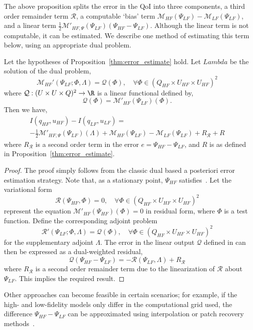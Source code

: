 The above proposition splits the error in the QoI into three components, a third order remainder term $\mathcal{R}$, a computable `bias' term $\mathcal{M}_{HF}(\Psi_{LF})-\mathcal{M}_{LF}(\Psi_{LF})$, and a linear term $\frac{1}{2}\mathcal{M}'_{HF,\Psi}(\Psi_{LF})(\Psi_{HF}-\Psi_{LF})$. Although the linear term is not computable, it can be estimated. We describe one method of estimating this term below, using an appropriate dual problem.

%
\begin{proposition}
\label{thm:error_estimate_dual}
Let the hypotheses of Proposition~\ref{thm:error_estimate} hold. Let $Lambda$ be the solution of the dual problem,
%
\begin{equation}
\mathcal{M}_{HF}'(\Psi_{LF};\Phi, \Lambda)=\mathcal{Q}(\Phi),\quad\forall\Phi\in(Q_{HF}\times U_{HF}\times U_{HF})^2
\end{equation}
%
where $\mathcal{Q}:(U \times U \times Q)^2 \to \R$ is a linear functional defined by,
%
\begin{equation}
\mathcal{Q}(\Phi)=\mathcal{M}'_{HF}(\Psi_{LF})(\Phi).
\label{eq:supadjout}
\end{equation}
%
Then we have,
%
\begin{multline}
\label{eq:finErrExp}
I(q_{HF},u_{HF})-I(q_{LF},u_{LF})=\\-\frac{1}{2}\mathcal{M}'_{HF,\Psi}(\Psi_{LF})(\Lambda)+\mathcal M_{HF}(\Psi_{LF})-\mathcal M_{LF}(\Psi_{LF}) + R_{\mathscr{R}} + R
\end{multline}
%
where $R_{\mathscr{R}}$ is a second order term in the error $e=\Psi_{HF}-\Psi_{LF}$, and $R$ is as defined in Proposition~\ref{thm:error_estimate}.
%
\end{proposition}
%
\begin{proof}
%
The proof simply follows from the classic dual based a posteriori error estimation strategy. Note that, as a stationary point, $\Psi_{HF}$ satisfies~. Let the variational form
%
\begin{equation}
\mathscr{R}(\Psi_{HF},\Phi)=0,\quad\forall\Phi\in(Q_{HF}\times U_{HF}\times U_{HF})^2
\label{eq:supadjsys}
\end{equation}
%
represent the equation $\mathcal{M}'_{HF}(\Psi_{HF})(\Phi)=0$ in residual form, where $\Phi$ is a test function. Define the corresponding adjoint problem
%
\begin{equation}
\mathscr{R}'(\Psi_{LF};\Phi,\Lambda)=\mathcal{Q}(\Phi),\quad\forall\Phi\in(Q_{HF}\times U_{HF}\times U_{HF})^2
\label{eq:superAdjEq}
\end{equation}
%
for the supplementary adjoint $\Lambda$. The error in the linear output $\mathcal{Q}$ defined in  can then be expressed as a dual-weighted residual,
%
\begin{equation}
\label{eq:adjOutErr}
\mathcal{Q}(\Psi_{HF}-\Psi_{LF})=-\mathscr{R}(\Psi_{LF},\Lambda) + R_{\mathscr{R}}
\end{equation}
%
where $R_{\mathscr{R}}$ is a second order remainder term due to the linearization of $\mathscr{R}$ about $\Psi_{LF}$. This implies the required result.
%
\end{proof}
%
Other approaches can become feasible in certain scenarios; for example, if the high- and low-fidelity models only differ in the computational grid used, the difference $\Psi_{HF}-\Psi_{LF}$ can be approximated using interpolation or patch recovery methods~\cite{BecVex05}.
